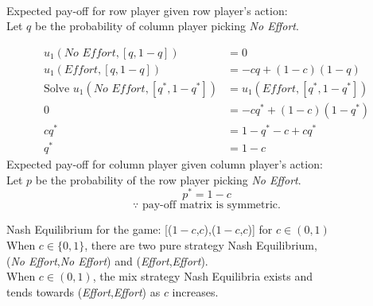 \documentclass[12pt]{article}
\newenvironment{solution}[2][Solution]{\begin{trivlist}
\item[\hskip \labelsep {\bfseries #1}]}{\end{trivlist}}
\begin{document}
\begin{solution}{}~\\
Expected pay-off for row player given row player's action:\\
Let $q$ be the probability of column player picking \textit{No Effort}.

\begin{align*}
u_1(\textit{No Effort}, [q,1-q])&=0\\
u_1(\textit{Effort}, [q,1-q])&=-cq+(1-c)(1-q)\\
\text{Solve }u_1(\textit{No Effort}, [q^*,1-q^*])&=u_1(\textit{Effort}, [q^*,1-q^*])\\
0&=-cq^*+(1-c)(1-q^*)\\
cq^*&=1-q^*-c+cq^*\\
q^*&=1-c
\end{align*}
Expected pay-off for column player given column player's action:\\
Let $p$ be the probability of the row player picking \textit{No Effort}.
$$p^*=1-c$$
$$\because \text{ pay-off matrix is symmetric.}$$

Nash Equilibrium for the game: [($1-c$,$c$),($1-c$,$c$)] for $c\in(0,1)$\\

When $c\in\{0,1\}$, there are two pure strategy Nash Equilibrium,\\
(\textit{No Effort},\textit{No Effort}) and (\textit{Effort},\textit{Effort}).\\

When $c\in(0,1)$, the mix strategy Nash Equilibria exists and \\
tends towards (\textit{Effort},\textit{Effort}) as $c$ increases.
\end{solution}
\end{document}
